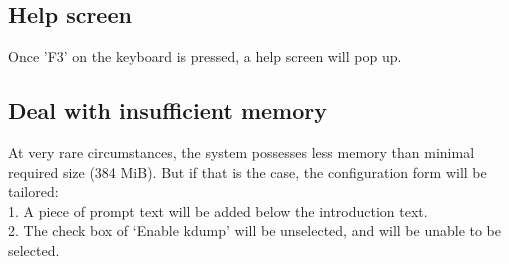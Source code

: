 \documentclass{article}
\begin{document}
\subsection{Help screen}
\noindent
Once 'F3' on the keyboard is pressed, a help screen will pop up.
\begin{figure}[H]        
\end{figure}

\subsection{Deal with insufficient memory}
\noindent
At very rare circumstances, the system possesses less memory than minimal
required size (384 MiB). But if that is the case, the configuration form will be
tailored:\\
1. A piece of prompt text will be added below the introduction text.\\
2. The check box of `Enable kdump' will be unselected, and will be unable to
be selected.\\
\begin{figure}[H]        
\end{figure}
\end{document}
